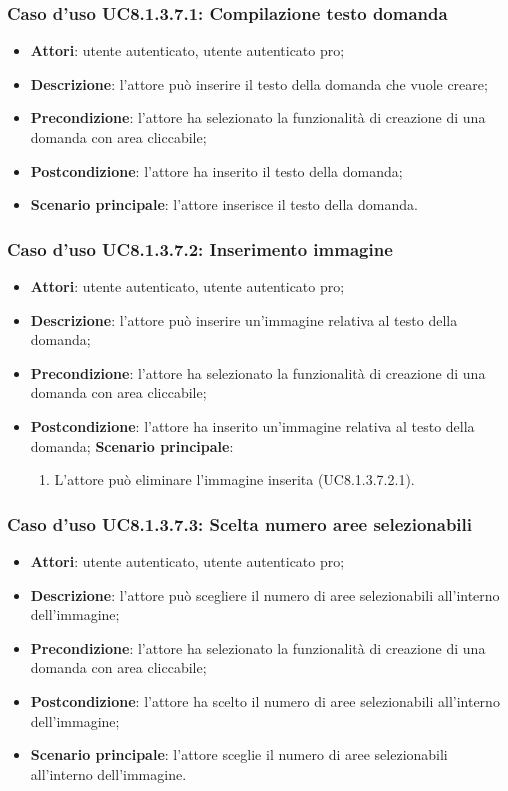 \subsubsection{Caso d'uso UC8.1.3.7.1: Compilazione testo domanda}
\begin{itemize}
	\item \textbf{Attori}: utente autenticato, utente autenticato pro;
	\item \textbf{Descrizione}: l'attore può inserire il testo della domanda che vuole creare;
	\item \textbf{Precondizione}: l'attore ha selezionato la funzionalità di creazione di una domanda con area cliccabile;
	\item \textbf{Postcondizione}: l'attore ha inserito il testo della domanda;
	\item \textbf{Scenario principale}: l'attore inserisce il testo della domanda. 
\end{itemize}

\subsubsection{Caso d'uso UC8.1.3.7.2: Inserimento immagine}
\begin{itemize}
	\item \textbf{Attori}: utente autenticato, utente autenticato pro;
	\item \textbf{Descrizione}: l'attore può inserire un'immagine relativa al testo della domanda;
	\item \textbf{Precondizione}: l'attore ha selezionato la funzionalità di creazione di una domanda con area cliccabile; 
	\item \textbf{Postcondizione}: l'attore ha inserito un'immagine relativa al testo della domanda;
	\textbf{Scenario principale}: 
			\begin{enumerate}
				\item L'attore può eliminare l'immagine inserita (UC8.1.3.7.2.1).	
			\end{enumerate}						
	\end{itemize}

\subsubsection{Caso d'uso UC8.1.3.7.3: Scelta numero aree selezionabili}
\begin{itemize}
	\item \textbf{Attori}: utente autenticato, utente autenticato pro;
	\item \textbf{Descrizione}: l'attore può scegliere il numero di aree selezionabili all'interno dell'immagine;
	\item \textbf{Precondizione}: l'attore ha selezionato la funzionalità di creazione di una domanda con area cliccabile; 
	\item \textbf{Postcondizione}: l'attore ha scelto il numero di aree selezionabili all'interno dell'immagine;
	\item \textbf{Scenario principale}: l'attore sceglie il numero di aree selezionabili all'interno dell'immagine. 	
\end{itemize}

